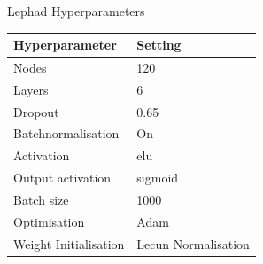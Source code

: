 \begin{frame}{Lephad Hyperparameters}
    \begin{table}[]
    \begin{tabular}{|l|l|}
    \hline
    Hyperparameter          &     Setting               \\ \hline
    Nodes                   &     120                    \\ \hline
    Layers                  &     6                  \\ \hline
    Dropout                 &     0.65                  \\ \hline
    Batchnormalisation      &     On                   \\ \hline
    Activation              &     elu                  \\ \hline
    Output activation       &     sigmoid              \\ \hline
    Batch size              &     1000                 \\ \hline
    Optimisation            &     Adam                 \\ \hline
    Weight Initialisation   &     Lecun Normalisation  \\ \hline
    \end{tabular}
    \end{table}
\end{frame}
  

